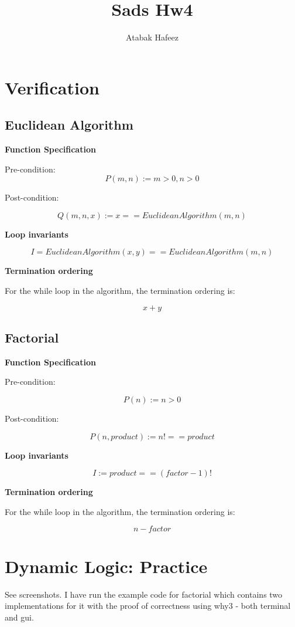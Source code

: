 \documentclass[11pt, oneside]{article}   	%
\title{Sads Hw4}
\author{Atabak Hafeez}
\begin{document}
\maketitle

\section{Verification}
\subsection{Euclidean Algorithm}
\noindent
\textbf{Function Specification}

Pre-condition:
$$ P(m,n) := m > 0, n > 0 $$

Post-condition:

$$Q(m,n,x) := x == EuclideanAlgorithm(m,n) $$

\noindent
\textbf{Loop invariants}

$$ I = EuclideanAlgorithm(x,y) == EuclideanAlgorithm (m,n) $$

\noindent
\textbf{Termination ordering}

For the while loop in the algorithm, the termination ordering is:

$$ x + y $$

\subsection{Factorial}

\noindent
\textbf{Function Specification}

Pre-condition:

$$ P(n) := n > 0 $$

Post-condition: 

$$ P(n, product) := n! == product $$

\newpage
\noindent
\textbf{Loop invariants}

$$ I := product == (factor - 1)! $$

\noindent
\textbf{Termination ordering}

For the while loop in the algorithm, the termination ordering is:

$$ n - factor $$

\section{Dynamic Logic: Practice}

See screenshots. I have run the example code for factorial which contains two implementations for it with the proof of correctness using why3 - both terminal and gui.
\end{document}
